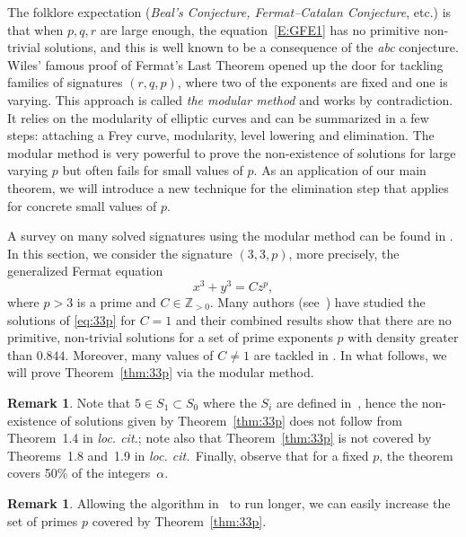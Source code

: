\documentclass[12pt]{amsart}
\numberwithin{equation}{section}
\theoremstyle{definition}
\newtheorem{remark}[equation]{Remark}
\newcommand{\Z}{\mathbb{Z}}
\newcommand{\loccit}{{\it loc. cit.}}
\begin{document}
The folklore expectation (\textit{Beal's Conjecture, Fermat--Catalan Conjecture}, etc.) is that when $p,q,r$ are large enough, the equation~\eqref{E:GFE1} has no primitive non-trivial solutions, and this is well known to be a consequence of the \textit{abc} conjecture.
Wiles' famous proof of Fermat's Last Theorem \cite{Wiles} opened up the door for tackling families of signatures $(r,q,p)$, where two of the exponents are fixed and one is varying.
This approach is called {\it the modular method} and works by contradiction. It relies on the modularity of elliptic curves and can be summarized in a few steps: attaching a Frey curve, modularity, level lowering and elimination.
The
modular method is very powerful to prove the non-existence of solutions for large varying $p$
but often fails for small values of $p$. As an application of our main theorem, we will introduce
a new technique for the elimination step that applies for concrete small values of $ p$.

A survey on many solved signatures using the modular method can be found in \cite{BCDY}.
In this section, we consider the signature $(3,3,p)$, more precisely, the generalized Fermat equation
\begin{equation} \label{eq:33p}
  x^3 + y^3 = Cz^p,
\end{equation}
where $p > 3$ is a prime and $C\in \Z_{>0}$. Many authors (see~\cite{Bruin, ChenSiksek,Freitas,Kraus33p}) have studied the solutions of \eqref{eq:33p} for $C=1$ and their combined results show that there are no primitive, non-trivial solutions for a set of prime exponents $p$ with density greater than $0.844$. Moreover, many values of $C\neq 1$ are tackled in \cite{BBF}. In what follows,  we will prove Theorem~\ref{thm:33p} via the modular method.


\begin{remark} Note that $5 \in S_1 \subset S_0$ where the $S_i$ are defined in~\cite[Introduction]{BBF}, hence the non-existence of solutions given by Theorem~\ref{thm:33p} does not follow from Theorem~1.4 in \loccit; note also  that Theorem~\ref{thm:33p} is not covered by Theorems~1.8 and~1.9 in \loccit $\:\:$Finally, observe that for a fixed $p$, the theorem covers 50\% of the integers~$\alpha$.
\end{remark}

\begin{remark}
Allowing the algorithm in~\cite{git} to run longer, we can easily increase the set of primes $p$ covered by Theorem~\ref{thm:33p}.
\end{remark}
\end{document}
